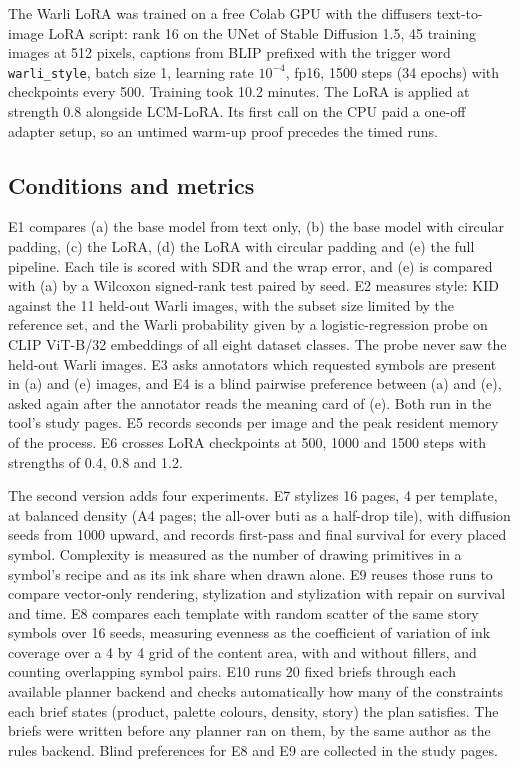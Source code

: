 \documentclass[conference]{IEEEtran}
\begin{document}
The Warli LoRA was trained on a free Colab GPU with the diffusers text-to-image LoRA script: rank 16 on the UNet of Stable Diffusion 1.5, 45 training images at 512 pixels, captions from BLIP prefixed with the trigger word \texttt{warli\_style}, batch size 1, learning rate $10^{-4}$, fp16, 1500 steps (34 epochs) with checkpoints every 500. Training took 10.2 minutes. The LoRA is applied at strength 0.8 alongside LCM-LoRA. Its first call on the CPU paid a one-off adapter setup, so an untimed warm-up proof precedes the timed runs.

\subsection{Conditions and metrics}

E1 compares (a) the base model from text only, (b) the base model with circular padding, (c) the LoRA, (d) the LoRA with circular padding and (e) the full pipeline. Each tile is scored with SDR and the wrap error, and (e) is compared with (a) by a Wilcoxon signed-rank test paired by seed. E2 measures style: KID against the 11 held-out Warli images, with the subset size limited by the reference set, and the Warli probability given by a logistic-regression probe on CLIP ViT-B/32 embeddings of all eight dataset classes. The probe never saw the held-out Warli images. E3 asks annotators which requested symbols are present in (a) and (e) images, and E4 is a blind pairwise preference between (a) and (e), asked again after the annotator reads the meaning card of (e). Both run in the tool's study pages. E5 records seconds per image and the peak resident memory of the process. E6 crosses LoRA checkpoints at 500, 1000 and 1500 steps with strengths of 0.4, 0.8 and 1.2.

The second version adds four experiments. E7 stylizes 16 pages, 4 per template, at balanced density (A4 pages; the all-over buti as a half-drop tile), with diffusion seeds from 1000 upward, and records first-pass and final survival for every placed symbol. Complexity is measured as the number of drawing primitives in a symbol's recipe and as its ink share when drawn alone. E9 reuses those runs to compare vector-only rendering, stylization and stylization with repair on survival and time. E8 compares each template with random scatter of the same story symbols over 16 seeds, measuring evenness as the coefficient of variation of ink coverage over a 4 by 4 grid of the content area, with and without fillers, and counting overlapping symbol pairs. E10 runs 20 fixed briefs through each available planner backend and checks automatically how many of the constraints each brief states (product, palette colours, density, story) the plan satisfies. The briefs were written before any planner ran on them, by the same author as the rules backend. Blind preferences for E8 and E9 are collected in the study pages.
\end{document}
